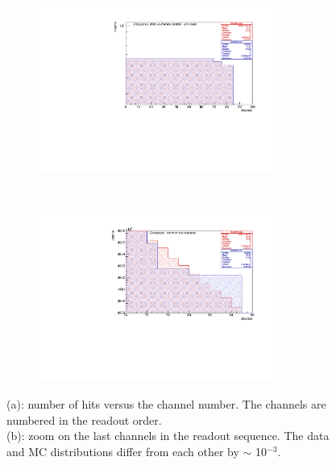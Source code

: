   \begin{figure}[!h]
    \begin{subfigure}[b]{\textwidth}
        \centering
        \includegraphics[width=0.85\textwidth]{figures/pdf/figure_00004_nhitsvschannel_roc_simulation_281.pdf}
        \caption{}
        \label{fig:tt1}
    \end{subfigure}
  \\
    \begin{subfigure}[b]{\textwidth}
        \centering
        \includegraphics[width=0.85\textwidth]{figures/pdf/figure_00014_nhitsvschannel_roc_simulation_281.pdf}
        \caption{}
        \label{fig:tt2}
    \end{subfigure}
       \caption{(a): number of hits versus the channel number. The channels are numbered in the readout order.
       \\
       (b): zoom on the last channels in the readout sequence. The data and MC distributions
       differ from each other by $\sim$ 10$^{-3}$.}
       \label{fig:2}
  \end{figure}


